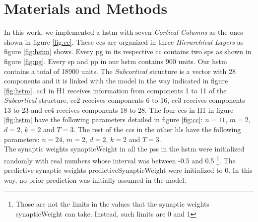 \documentclass[11pt,a4paper]{article}
\begin{document}
\section{Materials and Methods} \label{MatsMets}

In this work, we implemented a \ac{hstm} with seven \textit{Cortical Columns} as the ones shown in figure \ref{fig:cc}.
These \ac{cc}s are organized in three \textit{Hierarchical Layers} as figure \ref{fig:hstm} shows.
Every \ac{pg} in its respective \ac{cc} contains two \ac{sp}s as shown in figure \ref{fig:pg}.
Every \ac{sp} and \ac{pp} in our \ac{hstm} contains 900 units.
Our \ac{hstm} contains a total of 18900 units.
The \textit{Subcortical} structure is a vector with 28 components and it is linked with the
model in the way indicated in figure \ref{fig:hstm}.
\ac{cc}1 in H1 receives information from components 1 to 11 of the \textit{Subcortical} structure, \ac{cc}2 receives components 6 to 16,
\ac{cc}3 receives components 13 to 23 and \ac{cc}4 receives components 18 to 28.
The four \ac{cc}s in H1 in figure \ref{fig:hstm} have the following parameters detailed in figure \ref{fig:cc}:
$n = 11$, $m = 2$, $d = 2$, $k = 2$ and $T = 3$.
The rest of the \ac{cc}s in the other \ac{hl}s have the following parameters:
$n = 24$, $m = 2$, $d = 2$, $k = 2$ and $T = 3$.\\

The synaptic weights \ac{synapticWeight} in all the \ac{ps}s in the \ac{hstm}
were initialized randomly with real numbers whose interval was between -0.5 and 0.5
\footnote{Those are not the limits in the values that the synaptic weights \ac{synapticWeight} can take. Instead, such limits are 0 and 1}.
The predictive synaptic weights \ac{predictiveSynapticWeight} were initialized to 0.
In this way, no prior prediction was initially assumed in the model.\\
\end{document}
